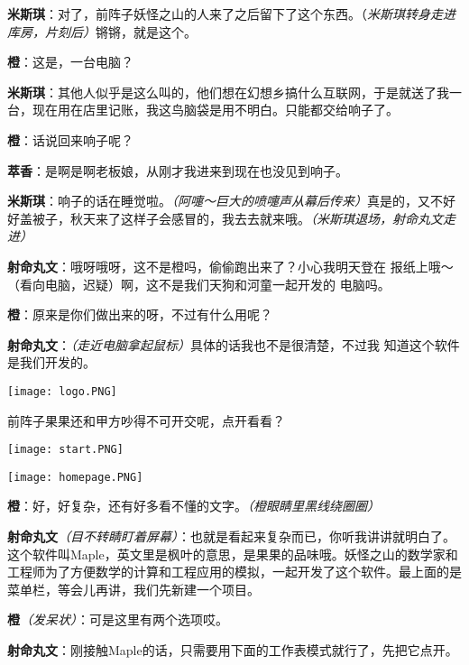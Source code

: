 \begin{multicols}{2}
    \textbf{米斯琪}：对了，前阵子妖怪之山的人来了之后留下了这个东西。（\textit{米斯琪转身走进库房，片刻后）}锵锵，就是这个。

    \textbf{橙}：这是，一台电脑？

    \textbf{米斯琪}：其他人似乎是这么叫的，他们想在幻想乡搞什么互联网，于是就送了我一台，现在用在店里记账，我这鸟脑袋是用不明白。只能都交给响子了。

    \textbf{橙}：话说回来响子呢？

    \textbf{萃香}：是啊是啊老板娘，从刚才我进来到现在也没见到响子。

    \textbf{米斯琪}：响子的话在睡觉啦。\textit{（阿嚏～巨大的喷嚏声从幕后传来）}真是的，又不好好盖被子，秋天来了这样子会感冒的，我去去就来哦。\textit{（米斯琪退场，射命丸文走进）}

    \textbf{射命丸文}：哦呀哦呀，这不是橙吗，偷偷跑出来了？小心我明天登在
    报纸上哦～（看向电脑，迟疑）啊，这不是我们天狗和河童一起开发的
    电脑吗。

    \textbf{橙}：原来是你们做出来的呀，不过有什么用呢？



    \textbf{射命丸文}：\textit{（走近电脑拿起鼠标）}具体的话我也不是很清楚，不过我
    知道这个软件是我们开发的。
    \begin{center}
        \texttt{[image: logo.PNG]}
    \end{center}
    前阵子果果还和甲方吵得不可开交呢，点开看看？

    \begin{center}
        \texttt{[image: start.PNG]}
    \end{center}

    \begin{center}
        \texttt{[image: homepage.PNG]}
    \end{center}

    \textbf{橙}：好，好复杂，还有好多看不懂的文字。\textit{（橙眼睛里黑线绕圈圈）}

    \textbf{射命丸文}\textit{（目不转睛盯着屏幕）}：也就是看起来复杂而已，你听我讲讲就明白了。这个软件叫Maple，英文里是枫叶的意思，是果果的品味哦。妖怪之山的数学家和工程师为了方便数学的计算和工程应用的模拟，一起开发了这个软件。最上面的是菜单栏，等会儿再讲，我们先新建一个项目。

    \textbf{橙}\textit{（发呆状）}：可是这里有两个选项哎。

    \textbf{射命丸文}：刚接触Maple的话，只需要用下面的工作表模式就行了，先把它点开。


\end{multicols}
